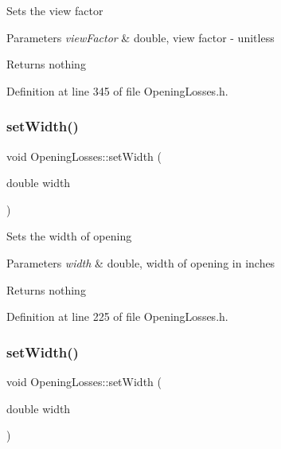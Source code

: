 Sets the view factor


\begin{DoxyParams}{Parameters}
{\em view\+Factor} & double, view factor -\/ unitless\\
\hline
\end{DoxyParams}
\begin{DoxyReturn}{Returns}
nothing 
\end{DoxyReturn}


Definition at line 345 of file Opening\+Losses.\+h.

\mbox{\label{class_opening_losses_a5ee8c514917c16ecd2c63caecc98e1c6}} 
\subsubsection{\texorpdfstring{set\+Width()}{setWidth()}\hspace{0.1cm}{\footnotesize\ttfamily [1/3]}}
{\footnotesize\ttfamily void Opening\+Losses\+::set\+Width (\begin{DoxyParamCaption}\item[{double}]{width }\end{DoxyParamCaption})\hspace{0.3cm}{\ttfamily [inline]}}

Sets the width of opening


\begin{DoxyParams}{Parameters}
{\em width} & double, width of opening in inches\\
\hline
\end{DoxyParams}
\begin{DoxyReturn}{Returns}
nothing 
\end{DoxyReturn}


Definition at line 225 of file Opening\+Losses.\+h.

\mbox{\label{class_opening_losses_a5ee8c514917c16ecd2c63caecc98e1c6}} 
\subsubsection{\texorpdfstring{set\+Width()}{setWidth()}\hspace{0.1cm}{\footnotesize\ttfamily [2/3]}}
{\footnotesize\ttfamily void Opening\+Losses\+::set\+Width (\begin{DoxyParamCaption}\item[{double}]{width }\end{DoxyParamCaption})\hspace{0.3cm}{\ttfamily [inline]}}

